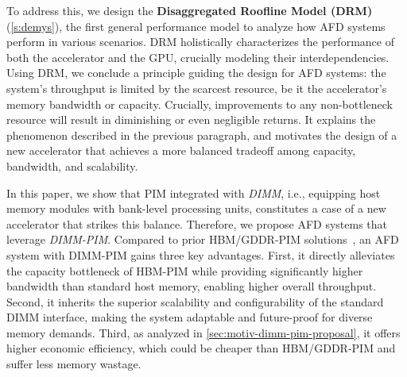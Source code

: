 To address this, we design the \textbf{Disaggregated Roofline Model (DRM)}(\textsection\ref{s:demys}), 
the first general performance model to analyze how AFD systems perform in various scenarios.
DRM holistically characterizes the performance of both the accelerator and the GPU, crucially modeling their interdependencies.
Using DRM, we conclude a principle guiding the design for AFD systems:
the system's throughput is limited by the scarcest resource, be it the accelerator's memory bandwidth or capacity.
Crucially, improvements to any non-bottleneck resource will result in diminishing or even negligible returns.
It explains the phenomenon described in the previous paragraph, and motivates the design of a new accelerator that achieves a more balanced tradeoff among capacity, bandwidth, and scalability.










In this paper, we show that PIM integrated with \textit{DIMM}, i.e., equipping host memory modules with bank-level processing units, constitutes a case of a new accelerator that strikes this balance.
Therefore, we propose AFD systems that leverage \textit{DIMM-PIM}.
Compared to prior HBM/GDDR-PIM solutions~\cite{heo2024neupims,park2024attacc,he2025papi,gu2025cent}, an AFD system with DIMM-PIM gains three key advantages.
First, it directly alleviates the capacity bottleneck of HBM-PIM while providing significantly higher bandwidth than standard host memory, enabling higher overall throughput.
Second, it inherits the superior scalability and configurability of the standard DIMM interface, making the system adaptable and future-proof for diverse memory demands.
Third, as analyzed in \textsection\ref{sec:motiv-dimm-pim-proposal}, it offers higher economic efficiency, which could be cheaper than HBM/GDDR-PIM and suffer less memory wastage.


































